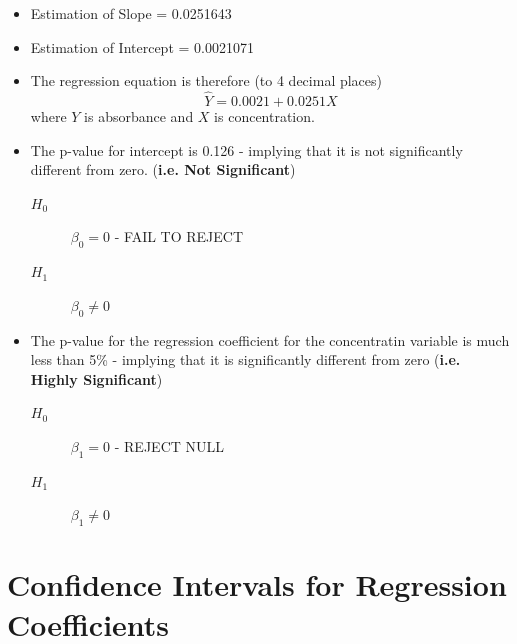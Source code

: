 \documentclass[a4paper,12pt]{article}
\begin{document}
\begin{itemize}
	\item Estimation of Slope = 0.0251643 %
	\item Estimation of Intercept
	= 0.0021071 %
\item The regression equation is therefore (to 4 decimal places)
\[ \hat{Y} = 0.0021 +  0.0251X\] where $Y$ is absorbance and $X$ is concentration.
	\item The p-value for intercept is 0.126 - implying that it is not
	significantly different from zero. (\textbf{i.e. Not Significant})
	\begin{description}
		\item[ $H_0$] $\beta_0 = 0 $ - FAIL TO REJECT
		\item[ $H_1$] $\beta_0 \neq 0$
	\end{description}
\item The p-value for the regression coefficient for the concentratin variable is much less than 5\% -  implying that it is
	significantly different from zero (\textbf{i.e. Highly Significant})
		\begin{description}
			\item[ $H_0$] $\beta_1 = 0 $ - REJECT NULL
			\item[ $H_1$] $\beta_1 \neq 0$
		\end{description}
\end{itemize}
\newpage
\section{Confidence Intervals for Regression Coefficients} 
\large
\end{document}
